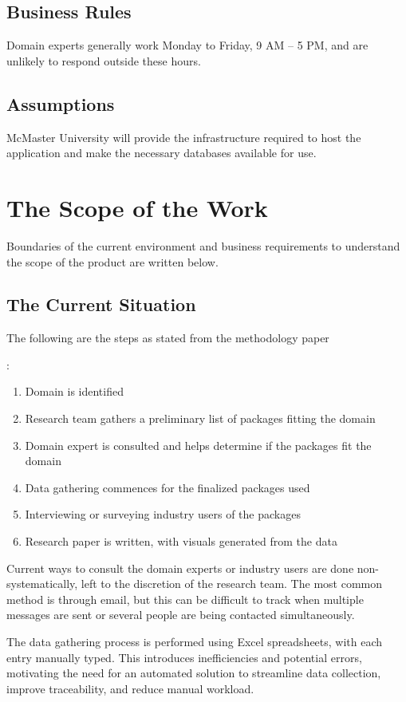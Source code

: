 \documentclass[12pt]{article}
\begin{document}
\subsection{Business Rules}
Domain experts generally work Monday to Friday, 9 AM – 5 PM, and are unlikely to respond outside these hours.
\subsection{Assumptions}
McMaster University will provide the infrastructure required to host the application and make the necessary databases available for use.

\section{The Scope of the Work}
Boundaries of the current environment and business requirements to understand the scope of the product are written below.
\subsection{The Current Situation}
The following are the steps as stated from the methodology paper

\cite{MethodologyPaper}:
\begin{enumerate}
    \item Domain is identified
    \item Research team gathers a preliminary list of packages fitting the domain
    \item Domain expert is consulted and helps determine if the packages fit the domain
    \item Data gathering commences for the finalized packages used
    \item Interviewing or surveying industry users of the packages
    \item Research paper is written, with visuals generated from the data
\end{enumerate}

Current ways to consult the domain experts or industry users are done non-systematically, left to the discretion of the research team. The most common method is through email, but this can be difficult to track when multiple messages are sent or several people are being contacted simultaneously.

The data gathering process is performed using Excel spreadsheets, with each entry manually typed. This introduces inefficiencies and potential errors, motivating the need for an automated solution to streamline data collection, improve traceability, and reduce manual workload.
\end{document}
